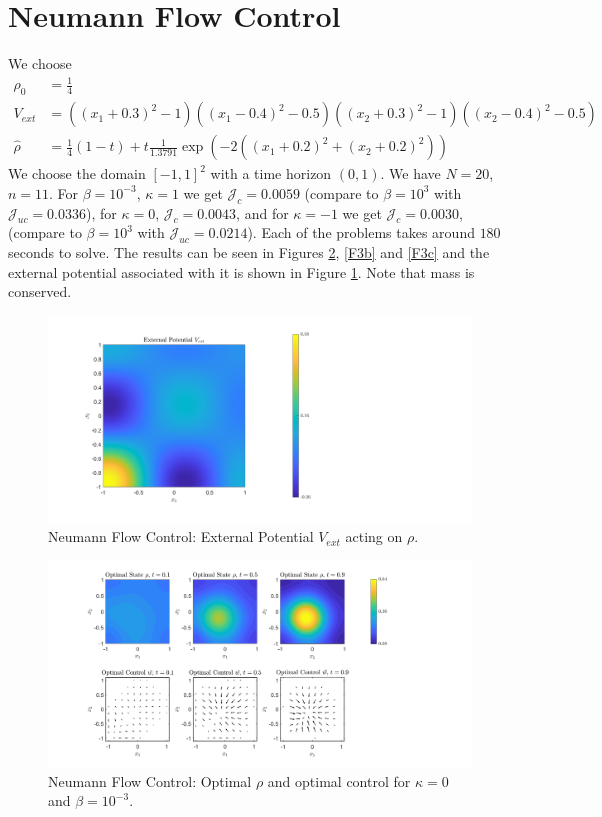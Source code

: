 \documentclass[11pt, a4paper]{article}
\theoremstyle{definition}
\newcommand{\hr}{\widehat \rho}
\begin{document}
	\section{Neumann Flow Control}
	We choose 
	\begin{align*}
		\rho_0 &= \frac{1}{4}\\
		V_{ext} &= \left(\left(x_1 + 0.3\right)^2 - 1\right)\left(\left(x_1-0.4\right)^2 - 0.5\right)
		\left(\left(x_2 + 0.3\right)^2 - 1\right)\left(\left(x_2-0.4\right)^2 - 0.5\right)\\
		\hr &= \frac{1}{4}(1-t) + t\frac{1}{1.3791}\exp{\left(-2\left(\left(x_1+0.2\right)^2 + \left(x_2+0.2\right)^2\right)\right)}
	\end{align*}
	We choose the domain $[-1,1]^2$ with a time horizon $(0,1)$. We have $N = 20$, $n = 11$. 
	For $\beta = 10^{-3}$, $\kappa = 1$ we get $\mathcal J_c = 0.0059$ (compare to $\beta = 10^3$ with $\mathcal J_{uc} = 0.0336$), for $\kappa = 0$, $\mathcal J_c = 0.0043$, and for $\kappa = - 1$ we get $\mathcal J_c = 0.0030$, (compare to $\beta = 10^3$ with $\mathcal J_{uc} = 0.0214$). Each of the problems takes around $180$ seconds to solve. The results can be seen in Figures \ref{F3a}, \ref{F3b} and \ref{F3c} and the external potential associated with it is shown in Figure \ref{F3V}. Note that mass is conserved.
	\begin{figure}[h]
		\centering
		\includegraphics[scale=0.35]{FcEx1Vext.png}
		\caption{Neumann Flow Control: External Potential $V_{ext}$ acting on $\rho$.} 
		\label{F3V}
	\end{figure}
	\begin{figure}[h]
		\centering
		\includegraphics[scale=0.35]{FcEx1k0.png}
		\caption{Neumann Flow Control: Optimal $\rho$ and optimal control for $\kappa = 0$ and $\beta = 10^{-3}$.} 
		\label{F3a}
	\end{figure}
\end{document}
